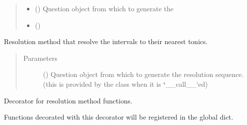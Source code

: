 \documentclass[letterpaper,10pt,english]{sphinxmanual}
\begin{document}
\begin{fulllineitems}
\begin{fulllineitems}
\begin{quote}
\begin{description}
\begin{itemize}
\item {} 
 () \textendash{} Question object from which to generate the

\item {} 
 () \textendash{} 

\end{itemize}

\end{description}\end{quote}

\end{fulllineitems}


\end{fulllineitems}


\begin{fulllineitems}
\label{\detokenize{birdears:birdears.resolution.nearest_tonic}}
Resolution method that resolve the intervals to their nearest tonics.
\begin{quote}\begin{description}
\item[{Parameters}] \leavevmode
{} () \textendash{} Question object from which to generate the
resolution sequence. (this is provided by the  class
when it is {\color{red}\bfseries{}{}`}\_\_call\_\_{}`ed)

\end{description}\end{quote}

\end{fulllineitems}


\begin{fulllineitems}
\label{\detokenize{birdears:birdears.resolution.register_resolution_method}}
Decorator for resolution method functions.

Functions decorated with this decorator will be registered in the
 global dict.

\end{fulllineitems}
\end{document}
